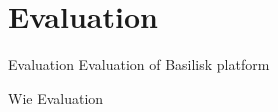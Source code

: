 \section{Evaluation}
\begin{frame}{Evaluation}
	Evaluation of Basilisk platform
	
	Wie Evaluation
\end{frame}